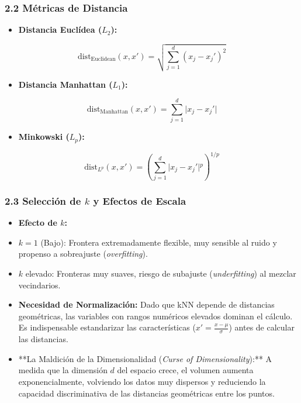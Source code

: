 \documentclass[11pt,oneside]{article}
\begin{document}
\subsubsection{2.2 Métricas de Distancia}

\begin{itemize}

\item \textbf{Distancia Euclídea (\(L_2\)):}

\end{itemize}

\[\text{dist}_{\text{Euclidean}}(x, x') = \sqrt{\sum_{j=1}^{d} (x_j - x_j')^2}\]

\begin{itemize}

\item \textbf{Distancia Manhattan (\(L_1\)):}

\end{itemize}

\[\text{dist}_{\text{Manhattan}}(x, x') = \sum_{j=1}^{d} \vert{}x_j - x_j'\vert{}\]

\begin{itemize}

\item \textbf{Minkowski (\(L_p\)):} 

\end{itemize}

\[\text{dist}_{L^p}(x, x') = \left( \sum_{j=1}^{d} \vert{}x_j - x_j'\vert{}^p \right)^{1/p}\]

\subsubsection{2.3 Selección de \(k\) y Efectos de Escala}

\begin{itemize}

\item \textbf{Efecto de \(k\):}

\item \(k=1\) (Bajo): Frontera extremadamente flexible, muy sensible al ruido y propenso a sobreajuste (\emph{overfitting}).

\item \(k\) elevado: Fronteras muy suaves, riesgo de subajuste (\emph{underfitting}) al mezclar vecindarios.

\item \textbf{Necesidad de Normalización:} Dado que kNN depende de distancias geométricas, las variables con rangos numéricos elevados dominan el cálculo. Es indispensable estandarizar las características (\(x' = \frac{x - \mu}{\sigma}\)) antes de calcular las distancias.

\item **La Maldición de la Dimensionalidad (\emph{Curse of Dimensionality}):** A medida que la dimensión \(d\) del espacio crece, el volumen aumenta exponencialmente, volviendo los datos muy dispersos y reduciendo la capacidad discriminativa de las distancias geométricas entre los puntos.

\end{itemize}
\end{document}

